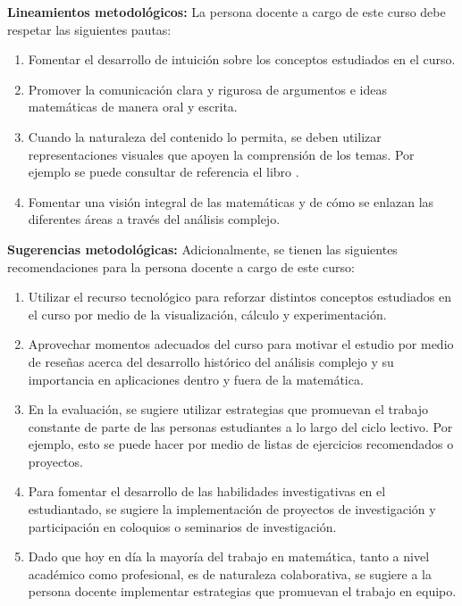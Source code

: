 \begin{refsection}
\noindent \textbf{Lineamientos metodológicos:} La persona docente a cargo de este curso debe respetar las siguientes pautas:
\begin{enumerate}
    \item Fomentar el desarrollo de intuición sobre los conceptos estudiados en el curso.
    \item Promover la comunicación clara y rigurosa de argumentos e ideas matemáticas de manera oral y escrita.
    \item Cuando la naturaleza del contenido lo permita, se deben utilizar representaciones visuales que apoyen la comprensión de los temas. Por ejemplo se puede consultar de referencia el libro \cite{Nee23}.
    \item Fomentar una visión integral de las matemáticas y de cómo se enlazan las diferentes áreas a través del análisis complejo.
\end{enumerate}

\textbf{Sugerencias metodológicas:} Adicionalmente, se tienen las siguientes recomendaciones para la persona docente a cargo de este curso:
\begin{enumerate}
    \item Utilizar el recurso tecnológico para reforzar distintos conceptos estudiados en el curso por medio de la visualización, cálculo y experimentación.
    \item Aprovechar momentos adecuados del curso para motivar el estudio por medio de reseñas acerca del desarrollo histórico del análisis complejo y su importancia en aplicaciones dentro y fuera de la matemática. %
    \item En la evaluación, se sugiere utilizar estrategias que promuevan el trabajo constante de parte de las personas estudiantes a lo largo del ciclo lectivo. Por ejemplo, esto se puede hacer por medio de listas de ejercicios recomendados o proyectos.
    \item Para fomentar el desarrollo de las habilidades investigativas en el estudiantado, se sugiere la implementación de proyectos de investigación y participación en coloquios o seminarios de investigación.
    \item Dado que hoy en día la mayoría del trabajo en matemática, tanto a nivel académico como profesional, es de naturaleza colaborativa, se sugiere a la persona docente implementar estrategias que promuevan el trabajo en equipo.
\end{enumerate}



\end{refsection}
